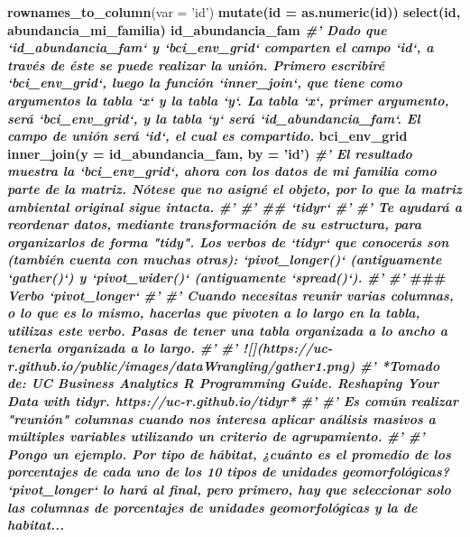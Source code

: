 \documentclass[11pt,]{article}
\newenvironment{Shaded}{\begin{snugshade}}{\end{snugshade}}
\newcommand{\KeywordTok}[1]{\textcolor[rgb]{0.13,0.29,0.53}{\textbf{#1}}}
\newcommand{\DataTypeTok}[1]{\textcolor[rgb]{0.13,0.29,0.53}{#1}}
\newcommand{\StringTok}[1]{\textcolor[rgb]{0.31,0.60,0.02}{#1}}
\newcommand{\CommentTok}[1]{\textcolor[rgb]{0.56,0.35,0.01}{\textit{#1}}}
\newcommand{\OperatorTok}[1]{\textcolor[rgb]{0.81,0.36,0.00}{\textbf{#1}}}
\newcommand{\AlertTok}[1]{\textcolor[rgb]{0.94,0.16,0.16}{#1}}
\newcommand{\NormalTok}[1]{#1}
\begin{document}
\begin{Shaded}
\begin{Highlighting}[]
{{{{{{{{{{{{{{{{{{{{{{{{{{{{{{{{{{{{{{{{{{{{{{{{{{{{{{{{{{{{{{{{{{{{{{\StringTok{  }\KeywordTok{rownames_to_column}\NormalTok{(}\DataTypeTok{var =} \StringTok{'id'}\NormalTok{) }\OperatorTok{%
\StringTok{  }\KeywordTok{mutate}\NormalTok{(}\DataTypeTok{id =} \KeywordTok{as.numeric}\NormalTok{(id)) }\OperatorTok{%
\StringTok{  }\KeywordTok{select}\NormalTok{(id, abundancia_mi_familia)}
\NormalTok{id_abundancia_fam }\OperatorTok{%
\CommentTok{#' Dado que `id_abundancia_fam` y `bci_env_grid` comparten el campo `id`, a través de éste se puede realizar la unión. Primero escribiré `bci_env_grid`, luego la función `inner_join`, que tiene como argumentos la tabla `x` y la tabla `y`. La tabla `x`, primer argumento, será `bci_env_grid`, y la tabla `y` será `id_abundancia_fam`. El campo de unión será `id`, el cual es compartido.}
\NormalTok{bci_env_grid }\OperatorTok{%
\StringTok{  }\KeywordTok{inner_join}\NormalTok{(}\DataTypeTok{y =}\NormalTok{ id_abundancia_fam, }\DataTypeTok{by =} \StringTok{'id'}\NormalTok{)}
\CommentTok{#' El resultado muestra la `bci_env_grid`, ahora con los datos de mi familia como parte de la matriz. Nótese que no asigné el objeto, por lo que la matriz ambiental original sigue intacta.}
\CommentTok{#' }
\CommentTok{#' ## `tidyr`}
\CommentTok{#' }
\CommentTok{#' Te ayudará a reordenar datos, mediante transformación de su estructura, para organizarlos de forma "tidy". Los verbos de `tidyr` que conocerás son (también cuenta con muchas otras): `pivot_longer()` (antiguamente `gather()`) y `pivot_wider()` (antiguamente `spread()`).}
\CommentTok{#' }
\CommentTok{#' }\AlertTok{###}\CommentTok{ Verbo `pivot_longer`}
\CommentTok{#' }
\CommentTok{#' Cuando necesitas reunir varias columnas, o lo que es lo mismo, hacerlas que pivoten a lo largo en la tabla, utilizas este verbo. Pasas de tener una tabla organizada a lo ancho a tenerla organizada a lo largo.}
\CommentTok{#' }
\CommentTok{#' ![](https://uc-r.github.io/public/images/dataWrangling/gather1.png)}
\CommentTok{#' *Tomado de: UC Business Analytics R Programming Guide. Reshaping Your Data with tidyr. https://uc-r.github.io/tidyr*}
\CommentTok{#' }
\CommentTok{#' Es común realizar "reunión" columnas cuando nos interesa aplicar análisis masivos a múltiples variables utilizando un criterio de agrupamiento. }
\CommentTok{#' }
\CommentTok{#' Pongo un ejemplo. Por tipo de hábitat, ¿cuánto es el promedio de los porcentajes de cada uno de los 10 tipos de unidades geomorfológicas? `pivot_longer` lo hará al final, pero primero, hay que seleccionar solo las columnas de porcentajes de unidades geomorfológicas y la de habitat...}
}}}}}}}}}}}}}}}}}}}}}}}}}}}}}}}}}}}}}}}}}}}}}}}}}}}}}}}}}}}}}}}}}}}}}}}}}}
\end{Highlighting}
\end{Shaded}
\end{document}
